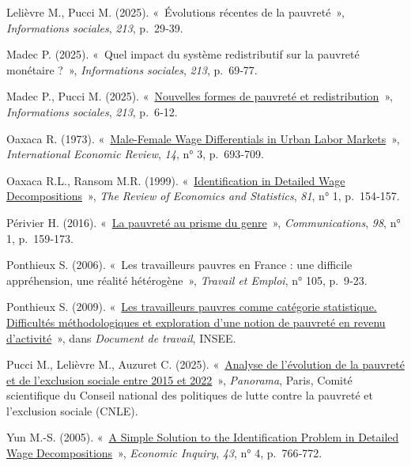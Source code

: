 \documentclass[
  french,
  9pt,
  a4paper,
]{article}
\newlength{\cslhangindent}
\newenvironment{CSLReferences}[2] %
 {\begin{list}{}{%
  \setlength{\itemindent}{0pt}
  \setlength{\leftmargin}{0pt}
  \setlength{\parsep}{0pt}
  \ifodd #1
   \setlength{\leftmargin}{\cslhangindent}
   \setlength{\itemindent}{-1\cslhangindent}
  \fi
  \setlength{\itemsep}{#2\baselineskip}}}
 {\end{list}}
\renewenvironment{CSLReferences}[2] %
    {\begin{list}{}{%
          \setlength{\itemindent}{0pt}
          \setlength{\leftmargin}{0pt}
          \setlength{\parsep}{0pt}
          \ifodd #1
          \setlength{\leftmargin}{\cslhangindent}
          \setlength{\itemindent}{-1\cslhangindent}
          \fi
          \setlength{\itemsep}{0.25\baselineskip}}} %
    {\end{list}}
\begin{document}
\begin{CSLReferences}{0}{1}
Lelièvre M., Pucci M. (2025). {«~Évolutions récentes de la pauvreté~»},
\emph{Informations sociales}, \emph{213}, p.~29‑39.

Madec P. (2025). {«~Quel impact du système redistributif sur la pauvreté
monétaire ?~»}, \emph{Informations sociales}, \emph{213}, p.~69‑77.

Madec P., Pucci M. (2025).
{«~\href{https://shs.cairn.info/revue-informations-sociales-2025-1}{Nouvelles
formes de pauvreté et redistribution}~»}, \emph{Informations sociales},
\emph{213}, p.~6‑12.

Oaxaca R. (1973). {«~\href{https://doi.org/10.2307/2525981}{Male-Female
Wage Differentials in Urban Labor Markets}~»}, \emph{International
Economic Review}, \emph{14}, n° 3, p.~693‑709.

Oaxaca R.L., Ransom M.R. (1999).
{«~\href{https://doi.org/10.1162/003465399767923908}{Identification in
Detailed Wage Decompositions}~»}, \emph{The Review of Economics and
Statistics}, \emph{81}, n° 1, p.~154‑157.

Périvier H. (2016). {«~\href{https://doi.org/10.3917/commu.098.0159}{La
pauvreté au prisme du genre}~»}, \emph{Communications}, \emph{98}, n° 1,
p.~159‑173.

Ponthieux S. (2006). {«~Les travailleurs pauvres en France : une
difficile appréhension, une réalité hétérogène~»}, \emph{Travail et
Emploi}, n° 105, p.~9‑23.

Ponthieux S. (2009).
{«~\href{https://www.insee.fr/fr/statistiques/1380868}{Les travailleurs
pauvres comme catégorie statistique. Difficultés méthodologiques et
exploration d'une notion de pauvreté en revenu d'activité}~»}, dans
\emph{Document de travail}, INSEE.

Pucci M., Lelièvre M., Auzuret C. (2025).
{«~\href{https://solidarites.gouv.fr/sites/solidarite/files/2025-05/Panorama-pauvrete-et-exclusion-entre-2015-et-2022-04-2025.pdf}{Analyse
de l'évolution de la pauvreté et de l'exclusion sociale entre 2015 et
2022}~»}, \emph{Panorama}, Paris, Comité scientifique du Conseil
national des politiques de lutte contre la pauvreté et l'exclusion
sociale (CNLE).

Yun M.-S. (2005). {«~\href{https://doi.org/10.1093/ei/cbi053}{A Simple
Solution to the Identification Problem in Detailed Wage
Decompositions}~»}, \emph{Economic Inquiry}, \emph{43}, n° 4,
p.~766‑772.

\end{CSLReferences}
\end{document}
